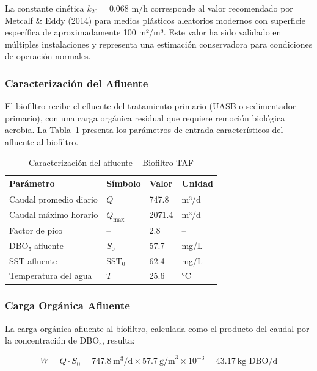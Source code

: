 \documentclass[12pt,a4paper]{article}
\begin{document}
La constante cinética $k_{20} = 0.068$ m/h corresponde al valor recomendado por Metcalf \& Eddy (2014) para medios plásticos aleatorios modernos con superficie específica de aproximadamente 100 m²/m³. Este valor ha sido validado en múltiples instalaciones y representa una estimación conservadora para condiciones de operación normales.

\subsubsection*{Caracterización del Afluente}

El biofiltro recibe el efluente del tratamiento primario (UASB o sedimentador primario), con una carga orgánica residual que requiere remoción biológica aerobia. La Tabla~\ref{tab:entrada_taf} presenta los parámetros de entrada característicos del afluente al biofiltro.

\begin{table}[H]
\centering
\caption{Caracterización del afluente -- Biofiltro TAF}
\label{tab:entrada_taf}
\begin{tabular}{llll}
\toprule
\textbf{Parámetro} & \textbf{Símbolo} & \textbf{Valor} & \textbf{Unidad} \\
\midrule
Caudal promedio diario & $Q$ & 747.8 & m³/d \\
Caudal máximo horario & $Q_{\text{max}}$ & 2071.4 & m³/d \\
Factor de pico & -- & 2.8 & -- \\
DBO₅ afluente & $S_0$ & 57.7 & mg/L \\
SST afluente & $\text{SST}_0$ & 62.4 & mg/L \\
Temperatura del agua & $T$ & 25.6 & °C \\

\bottomrule
\end{tabular}
\end{table}

\subsubsection*{Carga Orgánica Afluente}

La carga orgánica afluente al biofiltro, calculada como el producto del caudal por la concentración de DBO₅, resulta:

\begin{equation}
W = Q \cdot S_0 = 747.8\ \text{m}^3\text{/d} \times 57.7\ \text{g/m}^3 \times 10^{-3} = 43.17\ \text{kg DBO/d}
\end{equation}
\end{document}
